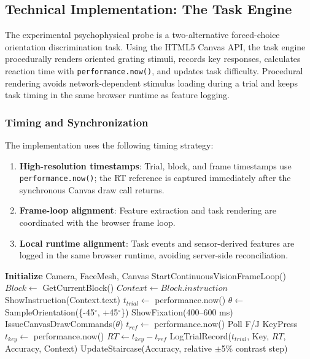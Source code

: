 \documentclass[dvipdfmx]{ehis}
\begin{document}
\subsection{Technical Implementation: The Task Engine}
The experimental psychophysical probe is a two-alternative forced-choice orientation discrimination task.
Using the HTML5 Canvas API, the task engine procedurally renders oriented grating stimuli, records key responses, calculates reaction time with \texttt{performance.now()}, and updates task difficulty.
Procedural rendering avoids network-dependent stimulus loading during a trial and keeps task timing in the same browser runtime as feature logging.

\subsubsection{Timing and Synchronization}
The implementation uses the following timing strategy:
\begin{enumerate}
    \item \textbf{High-resolution timestamps}: Trial, block, and frame timestamps use \texttt{performance.now()}; the RT reference is captured immediately after the synchronous Canvas draw call returns.
    \item \textbf{Frame-loop alignment}: Feature extraction and task rendering are coordinated with the browser frame loop.
    \item \textbf{Local runtime alignment}: Task events and sensor-derived features are logged in the same browser runtime, avoiding server-side reconciliation.
\end{enumerate}

\begin{algorithm}
\caption{Camerala Task Loop (Simplified)}
\begin{algorithmic}
\STATE \textbf{Initialize} Camera, FaceMesh, Canvas
\STATE StartContinuousVisionFrameLoop()
    \STATE $Block \leftarrow$ GetCurrentBlock()
    \STATE $Context \leftarrow Block.instruction$
    \STATE ShowInstruction(Context.text)
        \STATE $t_{trial} \leftarrow$ performance.now()
        \STATE $\theta \leftarrow$ SampleOrientation(\{-45$^\circ$, +45$^\circ$\})
        \STATE ShowFixation(400--600 ms)
        \STATE IssueCanvasDrawCommands($\theta$)
        \STATE $t_{ref} \leftarrow$ performance.now()
            \STATE Poll F/J KeyPress
        \ENDWHILE
        \STATE $t_{key} \leftarrow$ performance.now()
        \STATE $RT \leftarrow t_{key} - t_{ref}$
        \STATE LogTrialRecord($t_{trial}$, Key, $RT$, Accuracy, Context)
        \STATE UpdateStaircase(Accuracy, relative $\pm$5\% contrast step)
    \ENDFOR
\ENDWHILE
\end{algorithmic}
\end{algorithm}
\end{document}
